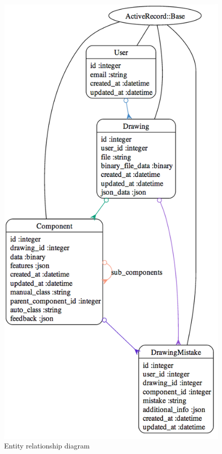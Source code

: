 \begin{figure}[hbt]
  \centering
  \includegraphics[width=.6\linewidth]{gfx/models-complete.png}
  \caption{\noteED Entity relationship diagram}
  \label{fig:erd}
\end{figure}





